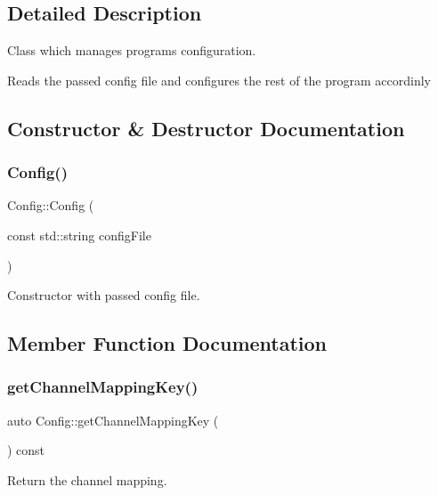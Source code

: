 \subsection{Detailed Description}
Class which manages programs configuration. 

Reads the passed config file and configures the rest of the program accordinly 

\subsection{Constructor \& Destructor Documentation}
\mbox{\label{class_config_af8b0e9dc72b16b73ebb32d177fb93e1b}} 
\subsubsection{\texorpdfstring{Config()}{Config()}}
{\footnotesize\ttfamily Config\+::\+Config (\begin{DoxyParamCaption}\item[{const std\+::string}]{config\+File }\end{DoxyParamCaption})}



Constructor with passed config file. 



\subsection{Member Function Documentation}
\mbox{\label{class_config_a29f6393b81473d6590f5cd6f6e927693}} 
\subsubsection{\texorpdfstring{get\+Channel\+Mapping\+Key()}{getChannelMappingKey()}}
{\footnotesize\ttfamily auto Config\+::get\+Channel\+Mapping\+Key (\begin{DoxyParamCaption}{ }\end{DoxyParamCaption}) const\hspace{0.3cm}{\ttfamily [inline]}}



Return the channel mapping. 

